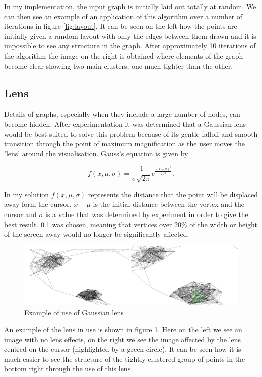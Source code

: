 \documentclass[12pt,a4paper]{article}
\begin{document}
In my implementation, the input graph is initially laid out totally at random. We can then see an example of an application of this algorithm over a number of iterations in figure \ref{fig:layout}. It can be seen on the left how the points are initially given a random layout with only the edges between them drawn and it is impossible to see any structure in the graph. After approximately 10 iterations of the algorithm the image on the right is obtained where elements of the graph become clear showing two main clusters, one much tighter than the other.

\subsection{Lens}
\noindent
Details of graphs, especially when they include a large number of nodes, can become hidden. After experimentation it was determined that a Gaussian lens would be best suited to solve this problem because of its gentle falloff and smooth transition through the point of maximum magnification as the user moves the 'lens' around the visualisation. Gauss's equation is given by 

\begin{equation}
\label{eq:Guass}
f(x,\mu,\sigma)=\frac{1}{\sigma\sqrt{2\pi}}e^{\frac{(x-\mu)^{2}}{2\sigma^{2}}}.
\end{equation}

In my solution $f(x, \mu, \sigma)$ represents the distance that the point will be displaced away form the cursor. $x-\mu$ is the initial distance between the vertex and the cursor and $\sigma$ is a value that was determined by experiment in order to give the best result. 0.1 was chosen, meaning that vertices over 20\% of the width or height of the screen away would no longer be significantly affected.

\begin{figure}[htb]
\caption{Example of use of Gaussian lens}
\label{fig:lens}
\centering
\includegraphics[scale=0.12]{Gaussian.png}
\end{figure}

An example of the lens in use is shown in figure \ref{fig:lens}. Here on the left we see an image with no lens effects, on the right we see the image affected by the lens centred on the cursor (highlighted by a green circle). It can be seen how it is much easier to see the structure of the tightly clustered group of points in the bottom right through the use of this lens.
\end{document}
